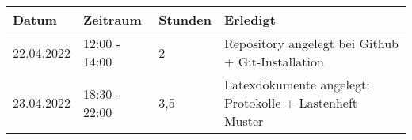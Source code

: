 \begin{tabular}{|l|l|l|l|}
\hline
Datum & Zeitraum & Stunden & Erledigt \\
\hline
    22.04.2022 & 12:00 - 14:00 & 2 & Repository angelegt bei Github +  Git-Installation\\
    23.04.2022 & 18:30 - 22:00 & 3,5 & Latexdokumente angelegt: Protokolle + Lastenheft Muster \\
\hline
\end{tabular}